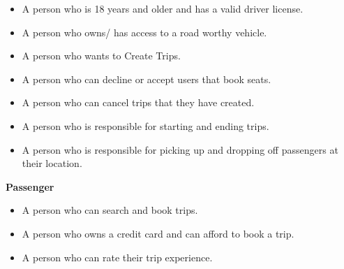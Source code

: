 \documentclass[hidelinks, 12pt, a4paper]{article}
\begin{document}
\begin{itemize}

      \item A person who is 18 years and older and has a valid driver license.
      \item A person who owns/ has access to a road worthy vehicle.
      \item A person who wants to Create Trips.
      \item A person who can decline or accept users that book seats.
      \item A person who can cancel trips that they have created.
      \item A person who is responsible for starting and ending trips.
      \item  A person who is responsible for picking up and dropping off passengers at their location.
\end{itemize}
\vspace{0.5cm}

\large{ \textbf{Passenger} }

\begin{itemize}

      \item A person who can search and book trips.
      \item A person who owns a credit card and can afford to book a trip.
      \item A person who can rate their trip experience.

\end{itemize}

\newpage
\end{document}
